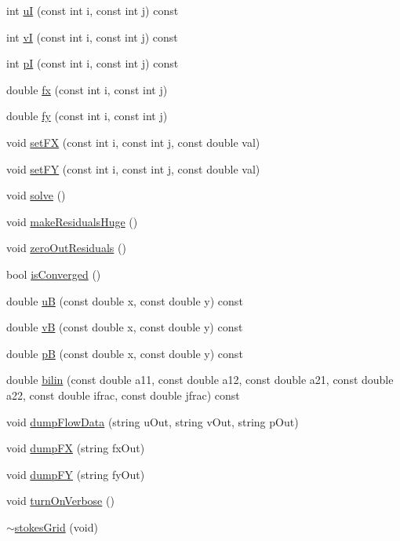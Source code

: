 \begin{DoxyCompactItemize}
\item 
int \hyperlink{classstokesGrid_a6a8dd61e5d32fb30978508b7abeafd48}{uI} (const int i, const int j) const
\item 
int \hyperlink{classstokesGrid_a60325ebee955fc114410de83260b681a}{vI} (const int i, const int j) const
\item 
int \hyperlink{classstokesGrid_a1219f8545755d880183f5beeba5a0e1a}{pI} (const int i, const int j) const
\item 
double \hyperlink{classstokesGrid_aac7540232f0fb8eb07db258ebd5e7774}{fx} (const int i, const int j)
\item 
double \hyperlink{classstokesGrid_a9a3c0ef33e9c5a6971c8c50319f22e39}{fy} (const int i, const int j)
\item 
void \hyperlink{classstokesGrid_a87a1387d4f623cda7c26aed5454895af}{set\+FX} (const int i, const int j, const double val)
\item 
void \hyperlink{classstokesGrid_ad86344e194c01329a8c38e569fc8f7cd}{set\+FY} (const int i, const int j, const double val)
\item 
void \hyperlink{classstokesGrid_ae85a3fe6aebbee5d78b574065e018d55}{solve} ()
\item 
void \hyperlink{classstokesGrid_a7b5df7cd0927b5f6ab1b5e9297598bab}{make\+Residuals\+Huge} ()
\item 
void \hyperlink{classstokesGrid_a2df782e6f854c2d9ad4c02e7b9a05a02}{zero\+Out\+Residuals} ()
\item 
bool \hyperlink{classstokesGrid_a08b3fe0546ec608ad9c333be5d4526f1}{is\+Converged} ()
\item 
double \hyperlink{classstokesGrid_ab0cbcaafe11c8fc6a7d0f535cc2ab4ce}{uB} (const double x, const double y) const
\item 
double \hyperlink{classstokesGrid_a86606c2ec040bf1ab3e1e83202b9c5b0}{vB} (const double x, const double y) const
\item 
double \hyperlink{classstokesGrid_a4ee64eaf9843bb919c9485761b2a8d1e}{pB} (const double x, const double y) const
\item 
double \hyperlink{classstokesGrid_ac2afbf908d608b2e274ca87be9c81853}{bilin} (const double a11, const double a12, const double a21, const double a22, const double ifrac, const double jfrac) const
\item 
void \hyperlink{classstokesGrid_a3ae2f8e65e54c35445d55baa3d61dda3}{dump\+Flow\+Data} (string u\+Out, string v\+Out, string p\+Out)
\item 
void \hyperlink{classstokesGrid_aa8b37287725d1688dbdf21dde31d0058}{dump\+FX} (string fx\+Out)
\item 
void \hyperlink{classstokesGrid_aeb5e12ba43e9e4ce2433b1cca7ac28e3}{dump\+FY} (string fy\+Out)
\item 
void \hyperlink{classstokesGrid_a30a88cab7520df88c110c9f1acd57682}{turn\+On\+Verbose} ()
\item 
\hyperlink{classstokesGrid_a8cd3d5ec2336e61ce71253e40d7b3560}{$\sim$stokes\+Grid} (void)
\end{DoxyCompactItemize}


